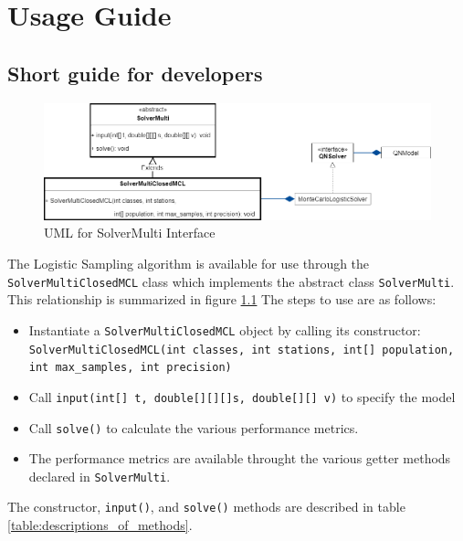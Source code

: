 \newpage

\chapter{Usage Guide}
\section{Short guide for developers}

\begin{figure}[H]
\centering
\includegraphics[width=1.\textwidth]{figures/DevGuideUML.png}
\caption{ UML for SolverMulti Interface}
\label{fig:DevGuideUML}
\end{figure}

The Logistic Sampling algorithm is available for use through the \texttt{SolverMultiClosedMCL} class which implements the abstract class \texttt{SolverMulti}. This relationship is summarized in figure \ref{fig:DevGuideUML} The steps to use are as follows:

\begin{itemize}[noitemsep]
    \item Instantiate a \texttt{SolverMultiClosedMCL} object by calling its constructor: \texttt{SolverMultiClosedMCL(int classes, int stations, int[] population, int max\_samples, int precision)}
    \item Call \texttt{input(int[] t, double[][][]s, double[][] v)} to specify the model
    \item Call \texttt{solve()} to calculate the various performance metrics.
    \item The performance metrics are available throught the various getter methods declared in \texttt{SolverMulti}.
\end{itemize}

The constructor, \texttt{input()}, and \texttt{solve()} methods are described in table \ref{table:descriptions_of_methods}.

